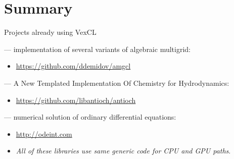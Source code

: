 \documentclass[@BEAMER_OPTIONS@]{beamer}
\begin{document}
\section{Summary}

\begin{frame}{Projects already using VexCL}
    \begin{description}[\quad]
        \item[AMGCL] --- implementation of several variants of algebraic
            multigrid:
            \begin{itemize}
                \item \href{https://github.com/ddemidov/amgcl}{https://github.com/ddemidov/amgcl}
            \end{itemize}
            \vspace{\baselineskip}
        \item[Antioch] --- A New Templated Implementation Of Chemistry for
            Hydrodynamics:
            \begin{itemize}
                \item \href{https://github.com/libantioch/antioch}{https://github.com/libantioch/antioch}
            \end{itemize}
            \vspace{\baselineskip}
        \item[Boost.odeint] --- numerical solution of ordinary differential
            equations:
            \begin{itemize}
                \item \href{http://odeint.com}{http://odeint.com}
            \end{itemize}
    \end{description}
    \vspace{\baselineskip}
    \begin{itemize}
        \item \emph{All of these libraries use same generic code for CPU and
            GPU paths}.
    \end{itemize}
\end{frame}

\note{ }
\end{document}
